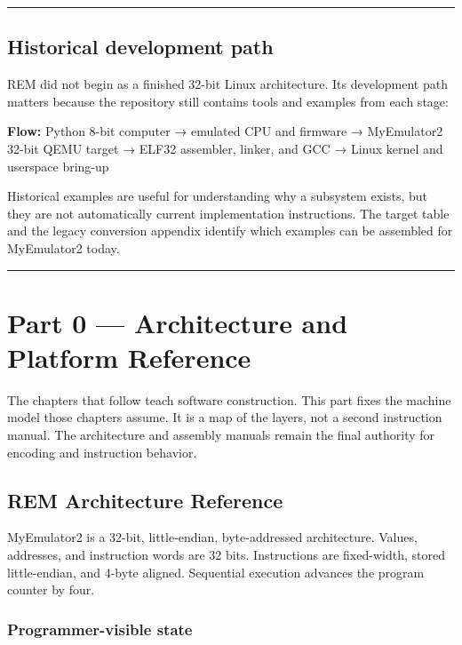 \documentclass[
  oneside,
  openany]{book}
\begin{document}
\begin{center}\rule{0.5\linewidth}{0.5pt}\end{center}

\hypertarget{historical-development-path}{%
\chapter{Historical development
path}\label{historical-development-path}}

REM did not begin as a finished 32-bit Linux architecture. Its
development path matters because the repository still contains tools and
examples from each stage:

\textbf{Flow:} Python 8-bit computer → emulated CPU and firmware →
MyEmulator2 32-bit QEMU target → ELF32 assembler, linker, and GCC →
Linux kernel and userspace bring-up

Historical examples are useful for understanding why a subsystem exists,
but they are not automatically current implementation instructions. The
target table and the legacy conversion appendix identify which examples
can be assembled for MyEmulator2 today.

\begin{center}\rule{0.5\linewidth}{0.5pt}\end{center}

\part{Part 0 — Architecture and Platform Reference}

The chapters that follow teach software construction. This part fixes
the machine model those chapters assume. It is a map of the layers, not
a second instruction manual. The architecture and assembly manuals
remain the final authority for encoding and instruction behavior.

\hypertarget{rem-architecture-reference}{%
\chapter{REM Architecture Reference}\label{rem-architecture-reference}}

MyEmulator2 is a 32-bit, little-endian, byte-addressed architecture.
Values, addresses, and instruction words are 32 bits. Instructions are
fixed-width, stored little-endian, and 4-byte aligned. Sequential
execution advances the program counter by four.

\hypertarget{programmer-visible-state}{%
\section{Programmer-visible state}\label{programmer-visible-state}}
\end{document}
